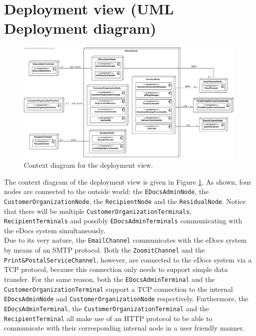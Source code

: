 \documentclass[a4paper,10pt]{article}
\begin{document}
\section{Deployment view (UML Deployment diagram)}\label{sec:deployment}
\begin{figure}[!htp]
	\centering
	\includegraphics[height=0.9\textheight]{ContextDeployment.png}
	\caption{Context diagram for the deployment view.}
	\label{fig:depl_context}
\end{figure}
\FloatBarrier
\noindent
The context diagram of the deployment view is given in Figure \ref{fig:depl_context}. As shown, four nodes are connected to the outside world: the \texttt{EDocsAdminNode}, the \texttt{CustomerOrganizationNode}, the \texttt{RecipientNode} and the \texttt{ResidualNode}. Notice that there will be multiple \texttt{CustomerOrganizationTerminals}, \texttt{RecipientTerminals} and possibly \texttt{EDocsAdminTerminals} communicating with the eDocs system simultaneously.\\
Due to its very nature, the \texttt{EmailChannel} communicates with the eDocs system by means of an SMTP protocol. Both the \texttt{ZoomitChannel} and the \texttt{Print\&PostalServiceChannel}, however, are connected to the eDocs system via a TCP protocol, because this connection only needs to support simple data transfer. For the same reason, both the \texttt{EDocsAdminTerminal} and the \texttt{CustomerOrganizationTerminal} support a TCP connection to the internal \texttt{EDocsAdminNode} and \texttt{CustomerOrganizationNode} respectively. Furthermore, the \texttt{EDocsAdminTerminal}, the \texttt{CustomerOrganizationTerminal} and the \texttt{RecipientTerminal} all make use of an HTTP protocol to be able to communicate with their corresponding internal node in a user friendly manner.
\end{document}
